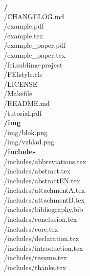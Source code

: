 \textbf{/} \\
/CHANGELOG.md \\
/example.pdf \\
/example.tex \\
/example\_paper.pdf \\
/example\_paper.tex \\
/fei.sublime-project \\
/FEIstyle.cls \\
/LICENSE \\
/Makefile \\
/README.md \\
/tutorial.pdf \\
\textbf{/img} \\
/img/blok.png \\
/img/vzhlad.png \\
\textbf{/includes} \\
/includes/abbreviations.tex \\
/includes/abstract.tex \\
/includes/abstractEN.tex \\
/includes/attachmentA.tex \\
/includes/attachmentB.tex \\
/includes/bibliography.bib \\
/includes/conclusion.tex \\
/includes/core.tex \\
/includes/declaration.tex \\
/includes/introduction.tex \\
/includes/resume.tex \\
/includes/thanks.tex 
